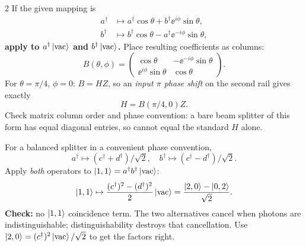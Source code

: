 \begin{multicols}{2}
 If the given mapping is
\begin{align*}
a^\dagger&\mapsto a^\dagger\cos\theta+b^\dagger\ee^{i\phi}\sin\theta,\\
b^\dagger&\mapsto b^\dagger\cos\theta-a^\dagger\ee^{-i\phi}\sin\theta,
\end{align*}
\textbf{apply to $a^\dagger\left\lvert \rm vac\right\rangle$ and $b^\dagger\left\lvert \rm vac\right\rangle$.} Place resulting coefficients as columns:
\[B(\theta,\phi)=\begin{pmatrix}\cos\theta&-\ee^{-i\phi}\sin\theta\\\ee^{i\phi}\sin\theta&\cos\theta\end{pmatrix}.\]
For $\theta=\pi/4$, $\phi=0$: $B=HZ$, so an \emph{input $\pi$ phase shift} on the second rail gives exactly
\[\boxed{H=B(\pi/4,0)Z.}\]
Check matrix column order and phase convention: a bare beam splitter of this form has equal diagonal entries, so cannot equal the standard $H$ alone.

For a balanced splitter in a convenient phase convention,
\[a^\dagger\mapsto(c^\dagger+d^\dagger)/\sqrt2,\quad
b^\dagger\mapsto(c^\dagger-d^\dagger)/\sqrt2.\]
Apply \emph{both} operators to $\left\lvert 1,1\right\rangle=a^\dagger b^\dagger\left\lvert \rm vac\right\rangle$:
\[\left\lvert 1,1\right\rangle\mapsto\frac{(c^\dagger)^2-(d^\dagger)^2}{2}\left\lvert \rm vac\right\rangle=\frac{\left\lvert 2,0\right\rangle-\left\lvert 0,2\right\rangle}{\sqrt2}.\]
\textbf{Check:} no $\left\lvert 1,1\right\rangle$ coincidence term. The two alternatives cancel when photons are indistinguishable; distinguishability destroys that cancellation. Use $\left\lvert 2,0\right\rangle=(c^\dagger)^2\left\lvert \rm vac\right\rangle/\sqrt2$ to get the factors right.


\end{multicols}
